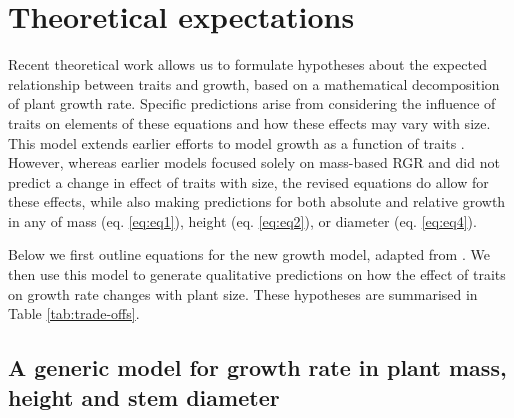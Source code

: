 \documentclass[a4paper,11pt]{article}
\begin{document}
\section*{Theoretical expectations}\label{theory}

Recent theoretical work \citep{Falster:2011ii} allows us to formulate hypotheses about the expected relationship between traits and growth, based on a mathematical decomposition of plant growth rate. Specific predictions arise from considering the influence of traits on elements of these equations and how these effects may vary with size. This model extends earlier efforts to model growth as a function of traits \citep{Lambers:1992bj,Cornelissen:1996hf,Wright:2000kw,Enquist:2007ek}. However, whereas earlier models focused solely on mass-based RGR and did not predict a change in effect of traits with size, the revised equations do allow for these effects, while also making predictions for both absolute and relative growth in any of mass (eq. \ref{eq:eq1}), height (eq. \ref{eq:eq2}), or diameter (eq. \ref{eq:eq4}).

Below we first outline equations for the new growth model, adapted from \citet{Falster:2011ii}. We then use this model to generate qualitative predictions on how the effect of traits on growth rate changes with plant size. These hypotheses are summarised in Table \ref{tab:trade-offs}.

\subsection*{A generic model for growth rate in plant mass, height and stem diameter}\label{sec:growth}
\end{document}
